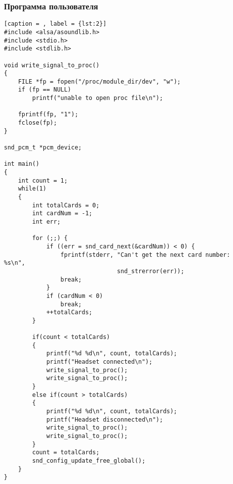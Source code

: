 \subsubsection{Программа пользователя}
\begin{lstlisting}[caption = , label = {lst:2}]
#include <alsa/asoundlib.h>
#include <stdio.h>
#include <stdlib.h>

void write_signal_to_proc()
{
    FILE *fp = fopen("/proc/module_dir/dev", "w");
    if (fp == NULL)
        printf("unable to open proc file\n");

    fprintf(fp, "1");
    fclose(fp);
}

snd_pcm_t *pcm_device;

int main()
{
    int count = 1;
    while(1)
    {
        int totalCards = 0;   
        int cardNum = -1;     
        int err;

        for (;;) {
            if ((err = snd_card_next(&cardNum)) < 0) {
                fprintf(stderr, "Can't get the next card number: %s\n",
                                snd_strerror(err));
                break;
            }
            if (cardNum < 0)
                break;
            ++totalCards;   
        }
        
        if(count < totalCards)
        {
            printf("%d %d\n", count, totalCards);
            printf("Headset connected\n");
            write_signal_to_proc();
            write_signal_to_proc();
        }
        else if(count > totalCards)
        {
            printf("%d %d\n", count, totalCards);
            printf("Headset disconnected\n");
            write_signal_to_proc();
            write_signal_to_proc();
        }
        count = totalCards;
        snd_config_update_free_global();
    }
}
\end{lstlisting}
